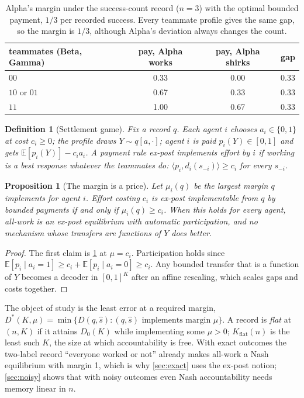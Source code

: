 \documentclass[sigconf,anonymous,acmthm=false]{aamas}
\theoremstyle{acmplain}
\newtheorem{proposition}{Proposition}
\theoremstyle{acmdefinition}
\newtheorem{definition}{Definition}
\newcommand{\E}{\mathbb{E}}
\newcommand{\Kflat}{K_{\mathrm{flat}}}
\newcommand{\shat}{\hat{s}}
\newcommand{\cube}{\{0,1\}}
\newcommand{\A}{\textsf{Alpha}}
\newcommand{\B}{\textsf{Beta}}
\newcommand{\G}{\textsf{Gamma}}
\begin{document}
\begin{table}[t]
\caption{\A's margin under the success-count record ($n=3$) with the optimal bounded
payment, $1/3$ per recorded success. Every teammate profile gives the same gap, so the margin
is $1/3$, although \A's deviation always changes the count.}
\label{tab:alpha}
\footnotesize
\begin{tabular}{@{}lccc@{}}
\toprule
teammates (\B, \G) & pay, \A{} works & pay, \A{} shirks & gap\\
\midrule
$00$ & 0.33 & 0.00 & 0.33\\
$10$ or $01$ & 0.67 & 0.33 & 0.33\\
$11$ & 1.00 & 0.67 & 0.33\\
\bottomrule
\end{tabular}
\end{table}

\begin{definition}[Settlement game]\label{def:game}
Fix a record $q$. Each agent $i$ chooses $a_i\in\cube$ at cost $c_i\ge0$; the profile draws
$Y\sim q[a,\cdot]$; agent $i$ is paid $p_i(Y)\in[0,1]$ and gets $\E[p_i(Y)]-c_ia_i$. A payment
rule \emph{ex-post implements} effort by $i$ if working is a best response whatever the
teammates do: $\langle p_i,d_i(s_{-i})\rangle\ge c_i$ for every $s_{-i}$.
\end{definition}

\begin{proposition}[The margin is a price]\label{prop:threshold}
Let $\mu_i(q)$ be the largest margin $q$ implements for agent $i$. Effort costing $c_i$ is
ex-post implementable from $q$ by bounded payments if and only if $\mu_i(q)\ge c_i$. When
this holds for every agent, all-work is an ex-post equilibrium with automatic participation,
and no mechanism whose transfers are functions of $Y$ does better.
\end{proposition}
\begin{proof}
The first claim is \cref{def:game} at $\mu=c_i$. Participation holds since
$\E[p_i\mid a_i=1]\ge c_i+\E[p_i\mid a_i=0]\ge c_i$. Any bounded transfer that is a function
of $Y$ becomes a decoder in $[0,1]^K$ after an affine rescaling, which scales gaps and costs
together.
\end{proof}

The object of study is the least error at a required margin,
$D^*(K,\mu)=\min\{D(q,\shat):(q,\shat)\text{ implements margin }\mu\}$. A record is
\emph{flat} at $(n,K)$ if it attains $D_0(K)$ while implementing some $\mu>0$; $\Kflat(n)$ is
the least such $K$, the size at which accountability is free. With exact outcomes the
two-label record ``everyone worked or not'' already makes all-work a Nash equilibrium with
margin 1, which is why \cref{sec:exact} uses the ex-post notion; \cref{sec:noisy} shows
that with noisy outcomes even Nash accountability needs memory linear in $n$.
\end{document}
